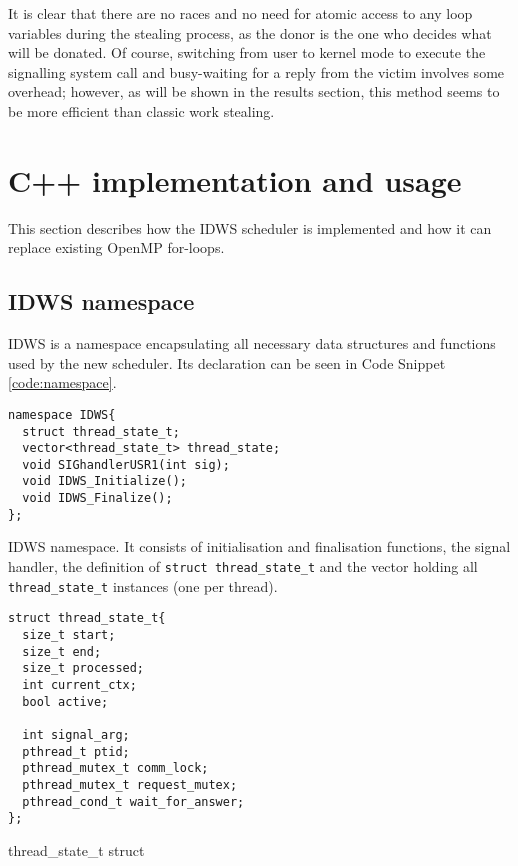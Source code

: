 \documentclass{acm_proc_article-sp}
\begin{document}
It is clear that there are no races and no need for atomic access to any loop
variables during the stealing process, as the donor is the one who decides what
will be donated. Of course, switching from user to kernel mode to execute the
signalling system call and busy-waiting for a reply from the victim involves some
overhead; however, as will be shown in the results section, this method seems to
be more efficient than classic work stealing.


\section{C++ implementation and usage}
\label{sect:implementation}
This section describes how the IDWS scheduler is implemented and how it can 
replace existing OpenMP for-loops.

\subsection{IDWS namespace}
\label{subsect:namespace}
IDWS is a namespace encapsulating all necessary data structures and functions 
used by the new scheduler. Its declaration can be seen in Code Snippet 
\ref{code:namespace}.

\begin{code}
\begin{lstlisting}
namespace IDWS{
  struct thread_state_t;
  vector<thread_state_t> thread_state;
  void SIGhandlerUSR1(int sig);
  void IDWS_Initialize();
  void IDWS_Finalize();
};
\end{lstlisting}
\caption{IDWS namespace. It consists of initialisation and finalisation 
functions, the signal handler, the definition of \texttt{struct 
thread\_state\_t} and the vector holding all \texttt{thread\_state\_t} 
instances (one per thread).}
\label{code:namespace}
\end{code}

\begin{code}
\begin{lstlisting}
struct thread_state_t{
  size_t start;
  size_t end;
  size_t processed;
  int current_ctx;
  bool active;

  int signal_arg;
  pthread_t ptid;
  pthread_mutex_t comm_lock;
  pthread_mutex_t request_mutex;
  pthread_cond_t wait_for_answer;
};
\end{lstlisting}
\caption{thread\_state\_t struct}
\label{code:thread}
\end{code}
\end{document}
